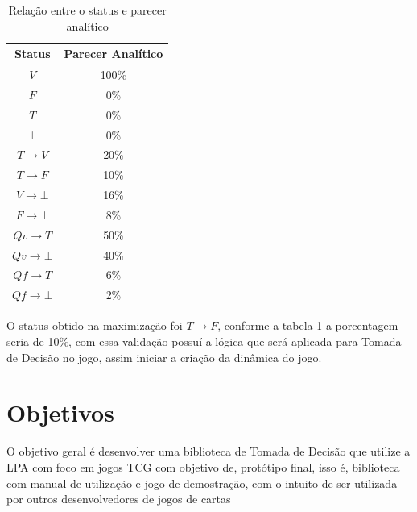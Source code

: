 \begin{table}[htb]
	\centering
	\caption{Relação entre o status e parecer analítico}
	\label{tab:analitica}
	\begin{tabular}{cc}
		\hline
		\multicolumn{1}{|c|}{\textbf{Status}} 	& \multicolumn{1}{c|}{\textbf{Parecer Analítico}} \\ \hline
		$V$               						& 100\%                      \\
		$F$               						& 0\%                        \\
		$T$               						& 0\%                        \\
		$\bot$									& 0\%                        \\
		$T \rightarrow V$             			& 20\%                       \\
		$T \rightarrow F$            			& 10\%                       \\
		$V \rightarrow \bot$            		& 16\%                       \\
		$F \rightarrow \bot$            		& 8\%                        \\
		$Qv \rightarrow T$            			& 50\%                       \\
		$Qv \rightarrow \bot$           		& 40\%                       \\
		$Qf \rightarrow T$            			& 6\%                        \\
		$Qf \rightarrow \bot$           		& 2\%                       
	\end{tabular}
\end{table}

O status obtido na maximização foi $T \rightarrow F$, conforme a tabela \ref{tab:analitica} a porcentagem seria de 10\%, com essa validação possuí a lógica que será aplicada para Tomada de Decisão no jogo, assim iniciar a criação da dinâmica do jogo.

\section{Objetivos}

O objetivo geral é desenvolver uma biblioteca de Tomada de Decisão que utilize a LPA com foco em jogos TCG com objetivo de, protótipo final, isso é, biblioteca com manual de utilização e jogo de demostração, com o intuito de ser utilizada por outros desenvolvedores de jogos de cartas


